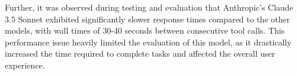 \documentclass[../report.tex]{subfiles}
\begin{document}
Further, it was observed during testing and evaluation that Anthropic's Claude 3.5 Sonnet exhibited significantly slower response times compared to the other models, with wall times of 30-40 seconds between consecutive tool calls. This performance issue heavily limited the evaluation of this model, as it drastically increased the time required to complete tasks and affected the overall user experience.
\end{document}
